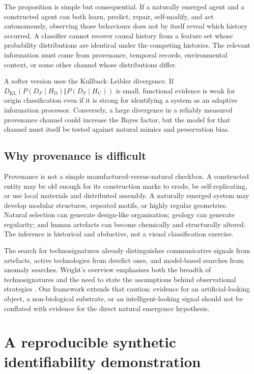 \documentclass[11pt]{article}
\newcommand{\HD}{H_{\mathrm{D}}}
\newcommand{\HC}{H_{\mathrm{C}}}
\newcommand{\KL}{D_{\mathrm{KL}}}
\begin{document}
The proposition is simple but consequential. If a naturally emerged agent and a constructed agent can both learn, predict, repair, self-modify, and act autonomously, observing those behaviours does not by itself reveal which history occurred. A classifier cannot recover causal history from a feature set whose probability distributions are identical under the competing histories. The relevant information must come from provenance, temporal records, environmental context, or some other channel whose distributions differ.

A softer version uses the Kullback--Leibler divergence. If $\KL(P(D_F\mid\HD)\Vert P(D_F\mid\HC))$ is small, functional evidence is weak for origin classification even if it is strong for identifying a system as an adaptive information processor. Conversely, a large divergence in a reliably measured provenance channel could increase the Bayes factor, but the model for that channel must itself be tested against natural mimics and preservation bias.

\subsection{Why provenance is difficult}

Provenance is not a simple manufactured-versus-natural checkbox. A constructed entity may be old enough for its construction marks to erode, be self-replicating, or use local materials and distributed assembly. A naturally emerged system may develop modular structures, repeated motifs, or highly regular geometries. Natural selection can generate design-like organisation; geology can generate regularity; and human artefacts can become chemically and structurally altered. The inference is historical and abductive, not a visual classification exercise.

The search for technosignatures already distinguishes communicative signals from artefacts, active technologies from derelict ones, and model-based searches from anomaly searches. Wright's overview emphasises both the breadth of technosignatures and the need to state the assumptions behind observational strategies \citep{Wright2021}. Our framework extends that caution: evidence for an artificial-looking object, a non-biological substrate, or an intelligent-looking signal should not be conflated with evidence for the direct natural emergence hypothesis.

\section{A reproducible synthetic identifiability demonstration}
\end{document}
